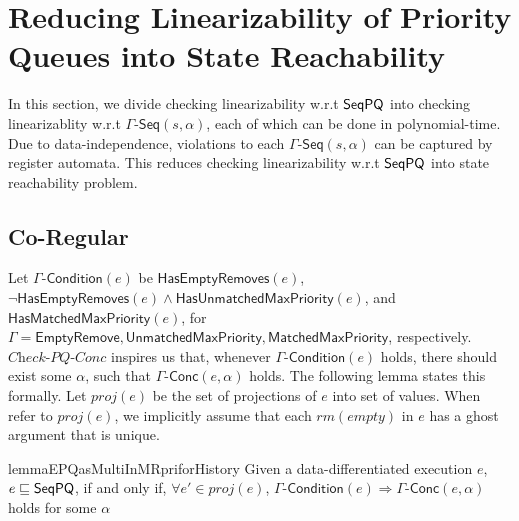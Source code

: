 \section{Reducing Linearizability of Priority Queues into State Reachability}
\label{sec:co-regular of extended priority queues}

In this section, we divide checking linearizability w.r.t $\mathsf{SeqPQ}$ into checking linearizablity w.r.t $\Gamma\mathsf{\text{-}Seq}(s,\alpha)$, each of which can be done in polynomial-time. Due to data-independence, violations to each $\Gamma\mathsf{\text{-}Seq}(s,\alpha)$ can be captured by register automata. This reduces checking linearizability w.r.t $\mathsf{SeqPQ}$ into state reachability problem.  



\subsection{Co-Regular}
\label{subsec:definition of co-regular} 

Let $\Gamma\mathsf{\text{-}Condition}(e)$ be $\mathsf{HasEmptyRemoves}(e)$, $\neg \mathsf{HasEmptyRemoves}(e) \wedge \mathsf{HasUnmatchedMaxPriority}(e)$, and $\mathsf{HasMatchedMaxPriority}(e)$, for $\Gamma = \mathsf{EmptyRemove}, \mathsf{UnmatchedMaxPriority}, \mathsf{MatchedMaxPriority}$, respectively. $\textit{Check-PQ-Conc}$ inspires us that, whenever $\Gamma\mathsf{\text{-}Condition}(e)$ holds, there should exist some $\alpha$, such that  $\Gamma\mathsf{\text{-}Conc}(e,\alpha)$ holds. The following lemma states this formally. Let $\textit{proj}(e)$ be the set of projections of $e$ into set of values. When refer to $\textit{proj}(e)$, we implicitly assume that each $\textit{rm}(\textit{empty})$ in $e$ has a ghost argument that is unique.

\begin{restatable}{lemma}{EPQasMultiInMRpriforHistory}
\label{lemma:EPQ as multi in MRpri for history}
Given a data-differentiated execution $e$, $e \sqsubseteq \mathsf{SeqPQ}$, if and only if, $\forall e' \in \textit{proj}(e)$, $\Gamma\mathsf{\text{-}Condition}(e) \Rightarrow \Gamma\mathsf{\text{-}Conc}(e,\alpha)$ holds for some $\alpha$
\end{restatable} 

